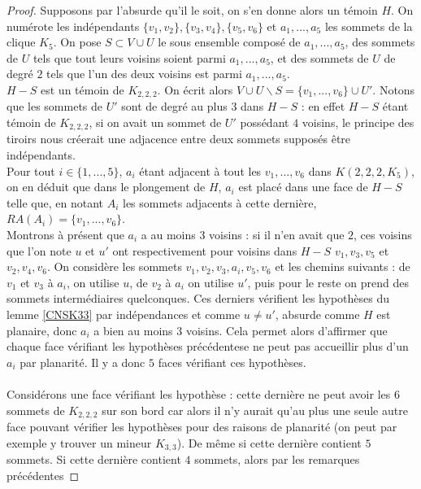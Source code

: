 \documentclass{scrartcl}
\begin{document}
\begin{flushleft}
\begin{proof}
    Supposons par l'absurde qu'il le soit, on s'en donne alors un témoin $H$. On numérote les indépendants $\{v_1, v_2\}, \{v_3, v_4\}, \{v_5, v_6\}$
    et $a_1, ..., a_5$ les sommets de la clique $K_5$. On pose $S \subset V \cup U$ le sous ensemble composé de $a_1, ..., a_5$, des sommets
    de $U$ tels que tout leurs voisins soient parmi $a_1, ..., a_5$, et des sommets de $U$ de degré $2$ tels que l'un des deux voisins
    est parmi $a_1, ..., a_5$.\\
    $H - S$ est un témoin de $K_{2,2,2}$. On écrit alors $V \cup U \backslash S = \{v_1, ..., v_6\} \cup U'$.
    Notons que les sommets de $U'$ sont de degré au plus $3$ dans $H - S$ : en effet $H-S$ étant témoin de $K_{2,2,2}$, si on avait
    un sommet de $U'$ possédant $4$ voisins, le principe des tiroirs nous créerait une adjacence entre deux sommets supposés être
    indépendants.\\
    Pour tout $i \in \{1, ..., 5\}$, $a_i$ étant adjacent à tout les $v_1, ..., v_6$ dans $K(2,2,2,K_5)$, on en déduit que dans le plongement
    de $H$, $a_i$ est placé dans une face de $H-S$ telle que, en notant $A_i$ les sommets adjacents à cette dernière, $RA(A_i) = \{v_1, ..., v_6\}$.\\
    Montrons à présent que $a_i$ a au moins $3$ voisins : si il n'en avait que $2$, ces voisins que l'on note
    $u$ et $u'$ ont respectivement pour voisins dans $H - S$ $v_1, v_3, v_5$ et $v_2, v_4, v_6$. On considère les sommets $v_1, v_2, v_3, a_i, v_5, v_6$
    et les chemins suivants : de $v_1$ et $v_3$ à $a_i$, on utilise $u$, de $v_2$ à $a_i$ on utilise $u'$, puis pour le reste on prend des sommets
    intermédiaires quelconques. Ces derniers vérifient les hypothèses du lemme \ref{CNSK33} par indépendances et comme $u \neq u'$, absurde comme $H$
    est planaire, donc $a_i$ a bien au moins $3$ voisins. Cela permet alors d'affirmer que chaque face vérifiant les hypothèses précédentese
    ne peut pas accueillir plus d'un $a_i$ par planarité. Il y a donc $5$ faces vérifiant ces hypothèses.
    \\~\\
    Considérons une face vérifiant les hypothèse : cette dernière ne peut avoir les $6$ sommets de $K_{2,2,2}$ sur son bord car alors il n'y aurait
    qu'au plus une seule autre face pouvant vérifier les hypothèses pour des raisons de planarité (on peut par exemple y trouver un mineur
    $K_{3,3}$). De même si cette dernière contient $5$ sommets. Si cette dernière contient $4$ sommets, alors par les remarques précédentes

\end{proof}
\end{flushleft}
\end{document}
